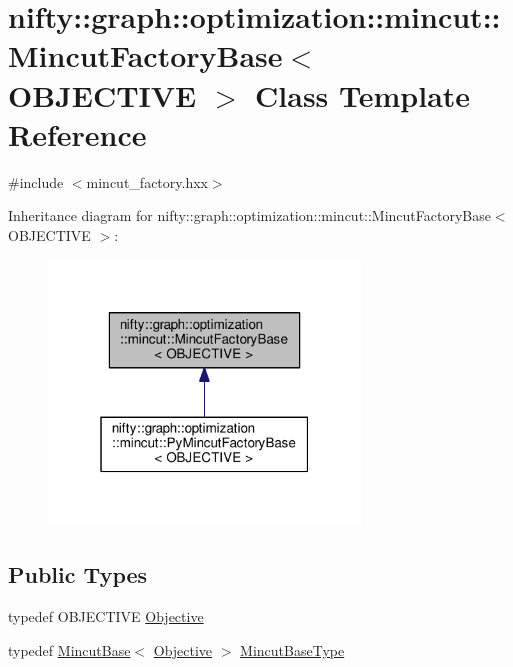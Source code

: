 \hypertarget{classnifty_1_1graph_1_1optimization_1_1mincut_1_1MincutFactoryBase}{}\section{nifty\+:\+:graph\+:\+:optimization\+:\+:mincut\+:\+:Mincut\+Factory\+Base$<$ O\+B\+J\+E\+C\+T\+I\+V\+E $>$ Class Template Reference}
\label{classnifty_1_1graph_1_1optimization_1_1mincut_1_1MincutFactoryBase}


{\ttfamily \#include $<$mincut\+\_\+factory.\+hxx$>$}



Inheritance diagram for nifty\+:\+:graph\+:\+:optimization\+:\+:mincut\+:\+:Mincut\+Factory\+Base$<$ O\+B\+J\+E\+C\+T\+I\+V\+E $>$\+:\nopagebreak
\begin{figure}[H]
\begin{center}
\leavevmode
\includegraphics[width=235pt]{classnifty_1_1graph_1_1optimization_1_1mincut_1_1MincutFactoryBase__inherit__graph}
\end{center}
\end{figure}
\subsection*{Public Types}
\begin{DoxyCompactItemize}
\item 
typedef O\+B\+J\+E\+C\+T\+I\+V\+E \hyperlink{classnifty_1_1graph_1_1optimization_1_1mincut_1_1MincutFactoryBase_a8ee3aff3639d955ad46ddeb2836db891}{Objective}
\item 
typedef \hyperlink{classnifty_1_1graph_1_1optimization_1_1mincut_1_1MincutBase}{Mincut\+Base}$<$ \hyperlink{classnifty_1_1graph_1_1optimization_1_1mincut_1_1MincutFactoryBase_a8ee3aff3639d955ad46ddeb2836db891}{Objective} $>$ \hyperlink{classnifty_1_1graph_1_1optimization_1_1mincut_1_1MincutFactoryBase_a42de59d331b39b682640cc9efda199a7}{Mincut\+Base\+Type}
\end{DoxyCompactItemize}
